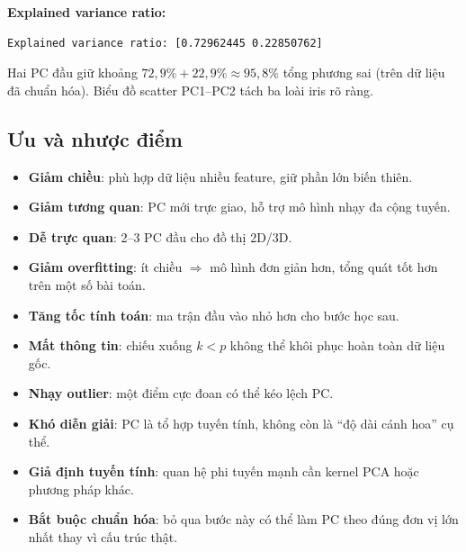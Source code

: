 \begin{ynghia}[title={Kết quả đầu ra}]
\textbf{Explained variance ratio:}
\begin{lstlisting}
Explained variance ratio: [0.72962445 0.22850762]
\end{lstlisting}
Hai PC đầu giữ khoảng $72{,}9\% + 22{,}9\% \approx 95{,}8\%$ tổng phương sai (trên dữ liệu đã chuẩn hóa). Biểu đồ scatter PC1--PC2 tách ba loài iris rõ ràng.

\end{ynghia}

\subsection{Ưu và nhược điểm}

\begin{tinhchat}[title={Ưu điểm}]
\begin{itemize}
  \item \textbf{Giảm chiều}: phù hợp dữ liệu nhiều feature, giữ phần lớn biến thiên.
  \item \textbf{Giảm tương quan}: PC mới trực giao, hỗ trợ mô hình nhạy đa cộng tuyến.
  \item \textbf{Dễ trực quan}: 2--3 PC đầu cho đồ thị 2D/3D.
  \item \textbf{Giảm overfitting}: ít chiều $\Rightarrow$ mô hình đơn giản hơn, tổng quát tốt hơn trên một số bài toán.
  \item \textbf{Tăng tốc tính toán}: ma trận đầu vào nhỏ hơn cho bước học sau.
\end{itemize}
\end{tinhchat}

\begin{luuy}[title={Nhược điểm}]
\begin{itemize}
  \item \textbf{Mất thông tin}: chiếu xuống $k < p$ không thể khôi phục hoàn toàn dữ liệu gốc.
  \item \textbf{Nhạy outlier}: một điểm cực đoan có thể kéo lệch PC.
  \item \textbf{Khó diễn giải}: PC là tổ hợp tuyến tính, không còn là ``độ dài cánh hoa'' cụ thể.
  \item \textbf{Giả định tuyến tính}: quan hệ phi tuyến mạnh cần kernel PCA hoặc phương pháp khác.
  \item \textbf{Bắt buộc chuẩn hóa}: bỏ qua bước này có thể làm PC theo đúng đơn vị lớn nhất thay vì cấu trúc thật.
\end{itemize}
\end{luuy}
